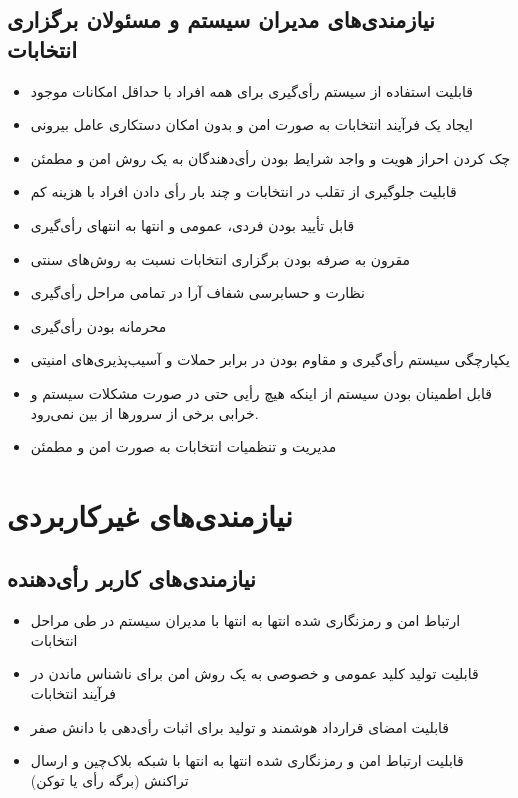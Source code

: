 \documentclass[12pt]{article}
\begin{document}
\subsection{نیازمندی‌های مدیران سیستم و مسئولان برگزاری انتخابات}
\begin{itemize}[leftmargin=*]
\item
قابلیت استفاده از سیستم رأی‌گیری برای همه افراد با حداقل امکانات موجود 
\item
ایجاد یک فرآیند انتخابات به صورت امن و بدون امکان دستکاری عامل بیرونی
\item
چک کردن احراز هویت و واجد شرایط بودن رأی‌دهندگان به یک روش امن و مطمئن
\item
قابلیت جلوگیری از تقلب در انتخابات و چند بار رأی دادن افراد با هزینه کم
\item
قابل تأیید بودن فردی، عمومی و انتها به انتهای رأی‌گیری
\item
مقرون به صرفه بودن برگزاری انتخابات نسبت به روش‌های سنتی
\item
نظارت و حسابرسی شفاف آرا در تمامی مراحل رأی‌گیری
\item
محرمانه بودن رأی‌گیری 
\item
یکپارچگی سیستم رأی‌گیری و مقاوم بودن در برابر حملات و آسیب‌پذیری‌های امنیتی
\item
قابل اطمینان بودن سیستم از اینکه هیچ رأیی حتی در صورت مشکلات سیستم و خرابی برخی از سرورها از بین نمی‌رود. 
\item
مدیریت و تنظمیات انتخابات به صورت امن و مطمئن
\end{itemize}






\section{نیازمندی‌های غیرکاربردی}
\subsection{نیازمندی‌های کاربر رأی‌دهنده}
\begin{itemize}[leftmargin=*]
\item
ارتباط امن و رمزنگاری شده انتها به انتها با مدیران سیستم در طی مراحل انتخابات
\item
قابلیت تولید کلید عمومی و خصوصی به یک روش امن برای ناشناس ماندن در فرآیند انتخابات
\item
قابلیت امضای قرارداد هوشمند و تولید 
برای اثبات رأی‌دهی با دانش صفر
\item
قابلیت ارتباط امن و رمزنگاری شده انتها به انتها با شبکه بلاک‌چین و ارسال تراکنش (برگه رأی یا توکن)
\end{itemize}
\end{document}
